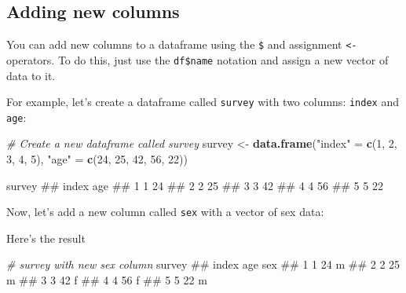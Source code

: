 \documentclass[]{book}
\newenvironment{Shaded}{\begin{snugshade}}{\end{snugshade}}
\newcommand{\KeywordTok}[1]{\textcolor[rgb]{0.13,0.29,0.53}{\textbf{{#1}}}}
\newcommand{\DecValTok}[1]{\textcolor[rgb]{0.00,0.00,0.81}{{#1}}}
\newcommand{\StringTok}[1]{\textcolor[rgb]{0.31,0.60,0.02}{{#1}}}
\newcommand{\CommentTok}[1]{\textcolor[rgb]{0.56,0.35,0.01}{\textit{{#1}}}}
\newcommand{\NormalTok}[1]{{#1}}
\theoremstyle{definition}
\theoremstyle{definition}
\theoremstyle{remark}
\begin{document}
\subsection{Adding new columns}\label{adding-new-columns}

You can add new columns to a dataframe using the \texttt{\$} and
assignment \texttt{\textless{}-} operators. To do this, just use the
\texttt{df\$name} notation and assign a new vector of data to it.

For example, let's create a dataframe called \texttt{survey} with two
columns: \texttt{index} and \texttt{age}:

\begin{Shaded}
\begin{Highlighting}[]
\CommentTok{# Create a new dataframe called survey}
\NormalTok{survey <-}\StringTok{ }\KeywordTok{data.frame}\NormalTok{(}\StringTok{"index"} \NormalTok{=}\StringTok{ }\KeywordTok{c}\NormalTok{(}\DecValTok{1}\NormalTok{, }\DecValTok{2}\NormalTok{, }\DecValTok{3}\NormalTok{, }\DecValTok{4}\NormalTok{, }\DecValTok{5}\NormalTok{),}
                     \StringTok{"age"} \NormalTok{=}\StringTok{ }\KeywordTok{c}\NormalTok{(}\DecValTok{24}\NormalTok{, }\DecValTok{25}\NormalTok{, }\DecValTok{42}\NormalTok{, }\DecValTok{56}\NormalTok{, }\DecValTok{22}\NormalTok{))}

\NormalTok{survey}
\NormalTok{##   index age}
\NormalTok{## 1     1  24}
\NormalTok{## 2     2  25}
\NormalTok{## 3     3  42}
\NormalTok{## 4     4  56}
\NormalTok{## 5     5  22}
\end{Highlighting}
\end{Shaded}

Now, let's add a new column called \texttt{sex} with a vector of sex
data:

\begin{Shaded}
\end{Shaded}

Here's the result

\begin{Shaded}
\begin{Highlighting}[]
\CommentTok{# survey with new sex column}
\NormalTok{survey}
\NormalTok{##   index age sex}
\NormalTok{## 1     1  24   m}
\NormalTok{## 2     2  25   m}
\NormalTok{## 3     3  42   f}
\NormalTok{## 4     4  56   f}
\NormalTok{## 5     5  22   m}
\end{Highlighting}
\end{Shaded}
\end{document}
